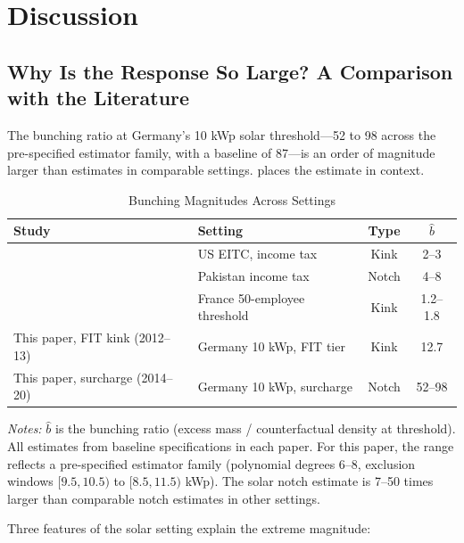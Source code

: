 \documentclass[12pt]{article}
\begin{document}
\section{Discussion}
\label{sec:discussion}

\subsection{Why Is the Response So Large? A Comparison with the Literature}

The bunching ratio at Germany's 10 kWp solar threshold---52 to 98 across the pre-specified estimator family, with a baseline of 87---is an order of magnitude larger than estimates in comparable settings.  places the estimate in context.

\begin{table}[t]
\centering
\caption{Bunching Magnitudes Across Settings}
\label{tab:benchmarks}
\begin{tabular}{llcc}
\toprule
Study & Setting & Type & $\hat{b}$ \\
\midrule
\citet{saez2010taxpayers} & US EITC, income tax & Kink & 2--3 \\
\citet{kleven2013using} & Pakistan income tax & Notch & 4--8 \\
\citet{garicano2016firm} & France 50-employee threshold & Kink & 1.2--1.8 \\
This paper, FIT kink (2012--13) & Germany 10 kWp, FIT tier & Kink & 12.7 \\
This paper, surcharge (2014--20) & Germany 10 kWp, surcharge & Notch & 52--98 \\
\bottomrule
\end{tabular}

\vspace{0.5em}
\begin{flushleft}\small \textit{Notes:} $\hat{b}$ is the bunching ratio (excess mass / counterfactual density at threshold). All estimates from baseline specifications in each paper. For this paper, the range reflects a pre-specified estimator family (polynomial degrees 6--8, exclusion windows $[9.5, 10.5)$ to $[8.5, 11.5)$ kWp). The solar notch estimate is 7--50 times larger than comparable notch estimates in other settings.\end{flushleft}
\end{table}

Three features of the solar setting explain the extreme magnitude:
\end{document}

